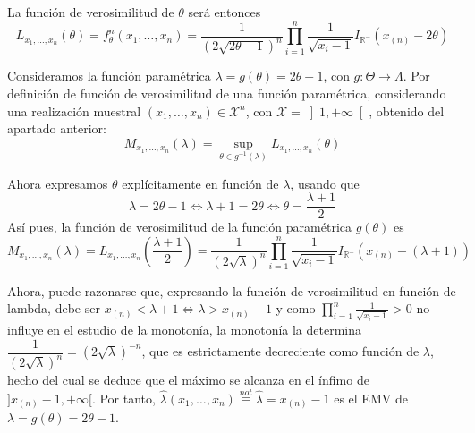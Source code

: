\documentclass[12pt]{article}
\newcommand{\R}{\mathbb{R}}
\newcommand{\X}{\mathcal{X}}
\newcommand{\Rmenos}{\R^{-}}
\begin{document}
\begin{ejercicio}[2,25 puntos]
\begin{enumerate}
            La función de verosimilitud de $\theta$ será entonces
            $$L_{x_1, \ldots, x_n}(\theta) = f_\theta^n(x_1, \ldots, x_n) = \dfrac{1}{(2\sqrt{2\theta-1})^n} \prod_{i=1}^n \dfrac{1}{\sqrt{x_i-1}} I_{\Rmenos}(x_{(n)} - 2 \theta)$$

            Consideramos la función paramétrica $\lambda = g(\theta) = 2 \theta - 1$, con $g: \Theta \to \Lambda$. Por definición de función de verosimilitud de una función paramétrica, considerando una realización muestral
            $(x_1, \ldots, x_n) \in \X^n$, con $\X = \left]1,+\infty \right[$, obtenido del apartado anterior:
            $$M_{x_1, \ldots, x_n}(\lambda) = \sup_{\theta \in g^{-1}(\lambda)} L_{x_1, \ldots, x_n}(\theta)$$

            Ahora expresamos $\theta$ explícitamente en función de $\lambda$, usando que $$\lambda = 2 \theta - 1 \iff \lambda + 1 = 2 \theta \iff \theta = \dfrac{\lambda+1}{2}$$
            Así pues, la función de verosimilitud de la función paramétrica $g(\theta)$ es
            $$M_{x_1, \ldots, x_n}(\lambda) = L_{x_1, \ldots, x_n}\left(\dfrac{\lambda+1}{2}\right) = \dfrac{1}{(2\sqrt{\lambda})^n} \prod_{i=1}^n \dfrac{1}{\sqrt{x_i-1}} I_{\Rmenos}(x_{(n)} - (\lambda+1))$$

            Ahora, puede razonarse que, expresando la función de verosimilitud en función de lambda, debe ser $x_{(n)} < \lambda + 1 \iff \lambda > x_{(n)} - 1$
            y como $\prod_{i=1}^n \frac{1}{\sqrt{x_i-1}} > 0$ no influye en el estudio de la monotonía, la monotonía la determina $\dfrac{1}{(2\sqrt{\lambda})^n} = (2\sqrt{\lambda})^{-n}$, 
            que es estrictamente decreciente como función de $\lambda$, hecho del cual se deduce que el máximo se alcanza en el ínfimo de $]x_{(n)} - 1, +\infty[$.
            Por tanto, $\hat{\lambda}(x_1, \ldots, x_n) \stackrel{not}{\equiv} \hat{\lambda} = x_{(n)} - 1$ es el EMV de $\lambda = g(\theta) = 2 \theta - 1$.
        \end{enumerate}
    \end{ejercicio}

    \newpage
\end{document}
